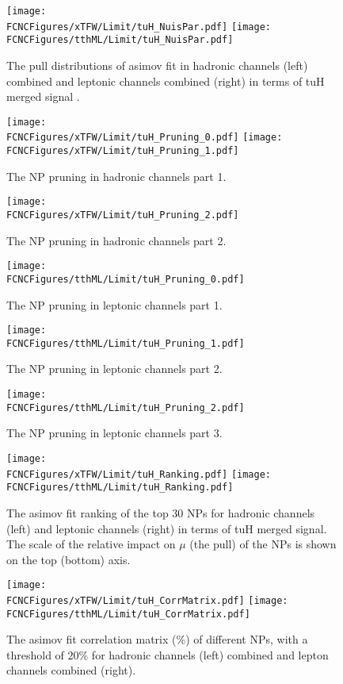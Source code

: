 \begin{figure}[htb]
\centering
\texttt{[image: \\FCNCFigures/xTFW/Limit/tuH\_NuisPar.pdf]}
\texttt{[image: \\FCNCFigures/tthML/Limit/tuH\_NuisPar.pdf]}
\caption{ The pull distributions of asimov fit in hadronic channels (left) combined and leptonic channels combined (right) in terms of tuH merged signal . }
\label{fig:fcnc_pull_data}
\end{figure}


\begin{figure}[htb]
\centering
\texttt{[image: \\FCNCFigures/xTFW/Limit/tuH\_Pruning\_0.pdf]}
\texttt{[image: \\FCNCFigures/xTFW/Limit/tuH\_Pruning\_1.pdf]}
\caption{ The NP pruning in hadronic channels part 1. }
\label{fig:xTFW_pruning_0}
\end{figure}

\begin{figure}[htb]
\centering
\texttt{[image: \\FCNCFigures/xTFW/Limit/tuH\_Pruning\_2.pdf]}
\caption{ The NP pruning in hadronic channels part 2. }
\label{fig:xTFW_pruning_1}
\end{figure}


\begin{figure}[htb]
\centering
\texttt{[image: \\FCNCFigures/tthML/Limit/tuH\_Pruning\_0.pdf]}
\caption{ The NP pruning in leptonic channels part 1. }
\label{fig:tthML_pruning_0}
\end{figure}

\begin{figure}[htb]
\centering
\texttt{[image: \\FCNCFigures/tthML/Limit/tuH\_Pruning\_1.pdf]}
\caption{ The NP pruning in leptonic channels part 2. }
\label{fig:tthML_pruning_1}
\end{figure}

\begin{figure}[htb]
\centering
\texttt{[image: \\FCNCFigures/tthML/Limit/tuH\_Pruning\_2.pdf]}
\caption{ The NP pruning in leptonic channels part 3. }
\label{fig:tthML_pruning_2}
\end{figure}

\begin{figure}[htb]
\centering
\texttt{[image: \\FCNCFigures/xTFW/Limit/tuH\_Ranking.pdf]}
\texttt{[image: \\FCNCFigures/tthML/Limit/tuH\_Ranking.pdf]}
\caption{ The asimov fit ranking of the top 30 NPs for hadronic channels (left) and leptonic channels (right) in terms of tuH merged signal. The scale of the relative impact on $\mu$ (the pull) of the NPs is shown on the top (bottom) axis.}
\label{fig:fcnc_rank_data}
\end{figure}

\begin{figure}[htb]
\centering
\texttt{[image: \\FCNCFigures/xTFW/Limit/tuH\_CorrMatrix.pdf]}
\texttt{[image: \\FCNCFigures/tthML/Limit/tuH\_CorrMatrix.pdf]}
\caption{ The asimov fit correlation matrix ($\%$) of different NPs, with a threshold of $20\%$ for hadronic channels (left) combined and lepton channels combined (right). }
\label{fig:fcnc_correl_data}
\end{figure}
